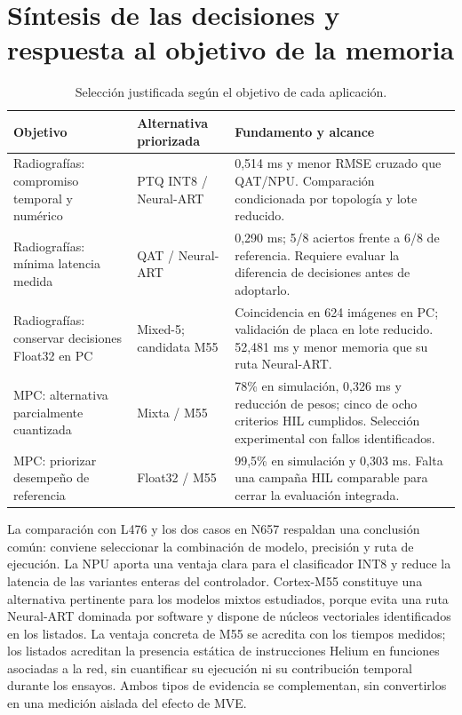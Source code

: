 \section{Síntesis de las decisiones y respuesta al objetivo de la memoria}
\begin{table}[H]\centering\small
\caption{Selección justificada según el objetivo de cada aplicación.}\label{tab:decision_final}
\begin{tabularx}{\linewidth}{p{2.7cm}p{3.2cm}Y}\toprule
Objetivo & Alternativa priorizada & Fundamento y alcance\\\midrule
Radiografías: compromiso temporal y numérico & PTQ INT8 / Neural-ART & 0,514 ms y menor RMSE cruzado que QAT/NPU. Comparación condicionada por topología y lote reducido.\\
Radiografías: mínima latencia medida & QAT / Neural-ART & 0,290 ms; 5/8 aciertos frente a 6/8 de referencia. Requiere evaluar la diferencia de decisiones antes de adoptarlo.\\
Radiografías: conservar decisiones Float32 en PC & Mixed-5; candidata M55 & Coincidencia en 624 imágenes en PC; validación de placa en lote reducido. 52,481 ms y menor memoria que su ruta Neural-ART.\\
MPC: alternativa parcialmente cuantizada & Mixta / M55 & 78\% en simulación, 0,326 ms y reducción de pesos; cinco de ocho criterios HIL cumplidos. Selección experimental con fallos identificados.\\
MPC: priorizar desempeño de referencia & Float32 / M55 & 99,5\% en simulación y 0,303 ms. Falta una campaña HIL comparable para cerrar la evaluación integrada.\\\bottomrule
\end{tabularx}
\end{table}

La comparación con L476 y los dos casos en N657 respaldan una conclusión común: conviene seleccionar la combinación de modelo, precisión y ruta de ejecución. La NPU aporta una ventaja clara para el clasificador INT8 y reduce la latencia de las variantes enteras del controlador. Cortex-M55 constituye una alternativa pertinente para los modelos mixtos estudiados, porque evita una ruta Neural-ART dominada por software y dispone de núcleos vectoriales identificados en los listados. La ventaja concreta de M55 se acredita con los tiempos medidos; los listados acreditan la presencia estática de instrucciones Helium en funciones asociadas a la red, sin cuantificar su ejecución ni su contribución temporal durante los ensayos. Ambos tipos de evidencia se complementan, sin convertirlos en una medición aislada del efecto de MVE.

